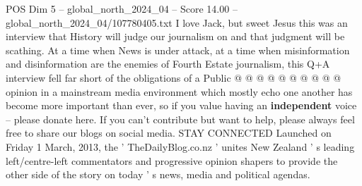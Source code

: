 \begin{textsample}{POS Dim 5 – global\_north\_2024\_04 – Score 14.00 – global\_north\_2024\_04/107780405.txt}
I love Jack, but sweet Jesus this was an interview that History will judge our journalism on and that judgment will be scathing.
At a time when News is under attack, at a time when misinformation and disinformation are the enemies of Fourth Estate journalism, this Q+A interview fell far short of the obligations of a Public @ @ @ @ @ @ @ @ @ @ opinion in a mainstream media environment which mostly echo one another has become more important than ever, so if you value having an \textbf{independent} voice -- please donate here.
If you can't contribute but want to help, please always feel free to share our blogs on social media.
STAY CONNECTED Launched on Friday 1 March, 2013, the ' TheDailyBlog.co.nz ' unites New Zealand ' s leading left/centre-left commentators and progressive opinion shapers to provide the other side of the story on today ' s news, media and political agendas.

\end{textsample}
